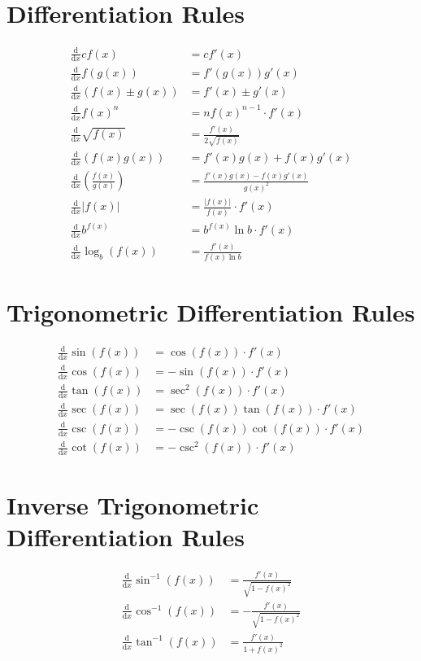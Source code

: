 \documentclass[12pt]{article}
\newcommand*{\asin}{\sin^{-1}}
\newcommand*{\acos}{\cos^{-1}}
\newcommand*{\atan}{\tan^{-1}}
\newcommand*{\dd}[3][]{\tfrac{\mathrm{d}^{#1}#2}{\mathrm{d}#3^{#1}}}
\newenvironment{rmskip}{\setlength{\abovedisplayskip}{0pt}%
  \setlength{\belowdisplayskip}{0pt}\ignorespaces}%
  {\ignorespacesafterend}
\begin{document}
\section*{Differentiation Rules}
\begin{rmskip}
  \begin{align*}
    \dd{}{x}c f(x) &= c f'(x)\\
    \dd{}{x}f(g(x)) &= f'(g(x))g'(x)\\
    \dd{}{x}(f(x) \pm g(x)) &= f'(x) \pm g'(x)\\
    \dd{}{x}{f(x)}^n &= n{f(x)}^{n-1} \cdot f'(x)\\
    \dd{}{x}\sqrt{f(x)} &= \frac{f'(x)}{2\sqrt{f(x)}}\\
    \dd{}{x}(f(x)g(x)) &= f'(x)g(x) + f(x)g'(x)\\
    \dd{}{x}\left(\frac{f(x)}{g(x)}\right) &= \frac{f'(x)g(x) - f(x)g'(x)}
      {{g(x)}^2}\\
    \dd{}{x}|f(x)| &= \frac{|f(x)|}{f(x)} \cdot f'(x)\\
    \dd{}{x}b^{f(x)} &= b^{f(x)} \ln b \cdot f'(x)\\
    \dd{}{x}\log_b(f(x)) &= \frac{f'(x)}{f(x) \ln b}
  \end{align*}
\end{rmskip}
\section*{Trigonometric Differentiation Rules}
\begin{rmskip}
  \begin{align*}
    \dd{}{x}\sin(f(x)) &= \cos(f(x)) \cdot f'(x)\\
    \dd{}{x}\cos(f(x)) &= -\sin(f(x)) \cdot f'(x)\\
    \dd{}{x}\tan(f(x)) &= \sec^2(f(x)) \cdot f'(x)\\
    \dd{}{x}\sec(f(x)) &= \sec(f(x))\tan(f(x)) \cdot f'(x)\\
    \dd{}{x}\csc(f(x)) &= -\csc(f(x))\cot(f(x)) \cdot f'(x)\\
    \dd{}{x}\cot(f(x)) &= -\csc^2(f(x)) \cdot f'(x)
  \end{align*}
\end{rmskip}
\section*{Inverse Trigonometric Differentiation Rules}
\begin{rmskip}
  \begin{align*}
    \dd{}{x}\asin(f(x)) &= \frac{f'(x)}{\sqrt{1 - {f(x)}^2}}\\
    \dd{}{x}\acos(f(x)) &= -\frac{f'(x)}{\sqrt{1 - {f(x)}^2}}\\
    \dd{}{x}\atan(f(x)) &= \frac{f'(x)}{1 + {f(x)}^2}
  \end{align*}
\end{rmskip}
\end{document}
